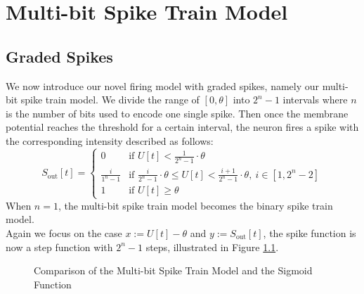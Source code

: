 \chapter{Multi-bit Spike Train Model}
\label{chap:multi-bit-spike-train-model}

\section{Graded Spikes}
\label{sec:graded-spikes}
    We now introduce our novel firing model with graded spikes, namely our multi-bit spike train model. We divide the range of $[0, \theta]$ into
    $2^n-1$ intervals where $n$ is the number of bits used to encode one single spike. Then once the membrane potential reaches the threshold 
    for a certain interval, the neuron fires a spike with the corresponding intensity described as follows:
    \begin{equation}
        \label{eq:multi-bit-spike}
        S_{\text{out}}[t] = \begin{cases}
            0               & \text{if } U[t] < \frac{1}{2^n-1}\cdot\theta \\
            \frac{i}{1^n-1} & \text{if } \frac{i}{2^n-1}\cdot\theta \leq U[t] < \frac{i+1}{2^n-1}\cdot\theta,\ i\in [1, 2^n-2]\\
            1               & \text{if } U[t] \geq \theta
        \end{cases}
    \end{equation}
    When $n = 1$, the multi-bit spike train model becomes the binary spike train model. \\
    Again we focus on the case $x := U[t] - \theta$ and $y := S_{\text{out}}[t]$, the spike function is now a step function with $2^n-1$ steps, illustrated in Figure \ref{fig:multi-bit-spike_sigmoid}. 
    \begin{figure}[!htpb]
        \centering
        \caption{Comparison of the Multi-bit Spike Train Model and the Sigmoid Function}
        \label{fig:multi-bit-spike_sigmoid}
    \end{figure}

